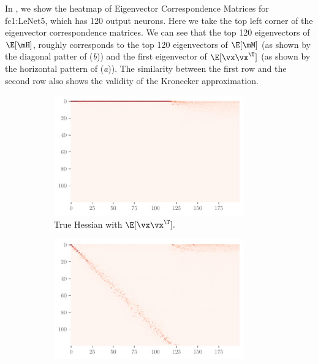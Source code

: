 In , we show the heatmap of Eigenvector Correspondence Matrices for fc1:LeNet5, which has 120 output neurons. Here we take the top left corner of the eigenvector correspondence matrices. We can see that the top 120 eigenvectors of $\E[\mH]$, roughly corresponds to the top 120 eigenvectors of $\E[\mM]$ (as shown by the diagonal patter of (\emph{b})) and the first eigenvector of $\E[\vx\vx^\T]$ (as shown by the horizontal pattern of (\emph{a})). The similarity between the first row and the second row also shows the validity of the Kronecker approximation.
\label{sec:eigen_corr}
\begin{figure}[H]
    \centering
    \begin{subfigure}[t]{0.46\textwidth}
        \centering
        \captionsetup{justification=centering}
        \includegraphics[width=0.9\textwidth]{Figures/Correspondence/LeNet5_fixlr0.01/xxT_Trueest_real_corr_expand_t200_CIFAR10_Exp1_LeNet5_fixlr0.01R2_E-1_fc1.pdf}
        \caption{True Hessian with $\E[\vx\vx^\T].$}
        \label{fig:Corr_xxT_True_fc}
    \end{subfigure}%
    \begin{subfigure}[t]{0.46\textwidth}
        \centering
        \captionsetup{justification=centering}
        \includegraphics[width=0.9\textwidth]{Figures/Correspondence/LeNet5_fixlr0.01/UTAU_Trueest_real_corr_expand_t200_CIFAR10_Exp1_LeNet5_fixlr0.01R2_E-1_fc1.pdf}

\end{subfigure}
\end{figure}
